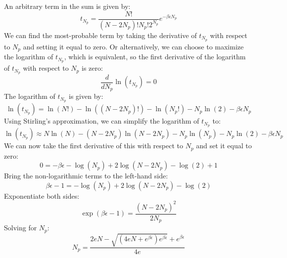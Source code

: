 \documentclass[10pt]{article}
\begin{document}
\subsection{}
An arbitrary term in the sum is given by:
\begin{equation}
  t_{N_p} = \frac{N !}{\left(N-2 N_{p}\right) ! N_{p} ! 2^{N_{p}}} e^{-\beta \epsilon N_p}
\end{equation}
We can find the most-probable term by taking the derivative of $t_{N_p}$ with respect to $N_p$ and setting it equal to zero. Or alternatively, we can choose to maximize the logarithm of $t_{N_p}$, which is equivalent, so the first derivative of the logarithm of $t_{N_p}$ with respect to $N_p$ is zero:
\begin{equation}
  \frac{d}{dN_p} \ln(t_{N_p}) = 0
\end{equation}
The logarithm of $t_{N_p}$ is given by:
\begin{equation}
  \ln(t_{N_p}) = \ln(N!) - \ln((N-2N_p)!) - \ln(N_p!) - N_p \ln(2) - \beta \epsilon N_p
\end{equation}
Using Stirling's approximation, we can simplify the logarithm of $t_{N_p}$ to:
\begin{equation}
  \ln(t_{N_p}) \approx N \ln(N) - (N-2N_p) \ln(N-2N_p) - N_p \ln(N_p) - N_p \ln(2) - \beta \epsilon N_p
\end{equation}
We can now take the first derivative of this with respect to $N_p$ and set it equal to zero:
\begin{equation}
  0 = - \beta \epsilon - \log{\left(N_p \right)} + 2 \log{\left(N - 2 N_p \right)} - \log{\left(2 \right)} + 1
\end{equation}
Bring the non-logarithmic terms to the left-hand side:
\begin{equation}
  \beta \epsilon - 1 = - \log{\left(N_p \right)} + 2 \log{\left(N - 2 N_p \right)} - \log{\left(2 \right)}
\end{equation}
Exponentiate both sides:
\begin{equation}
  \exp{\left(\beta \epsilon - 1 \right)} = \frac{(N - 2 N_p)^2}{2N_p}
\end{equation}
Solving for $N_p$:
\begin{equation}
  N_p = \frac{2 e N - \sqrt{\left(4 e N + e^{\beta \epsilon}\right) e^{\beta \epsilon}} + e^{\beta \epsilon}}{4 e}
\end{equation}
\end{document}
